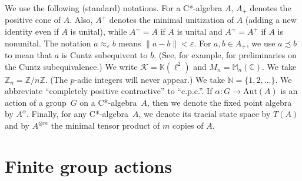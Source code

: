 \documentclass[11pt]{amsart}
\theoremstyle{plain}
\theoremstyle{definition}
\newtheorem{remark}[theorem]{Remark}
\theoremstyle{remark}
\numberwithin{equation}{section}
\newcommand{\af}{\alpha}
\begin{document}
\medskip

We use the following (standard) notations.
For a C*-algebra $A$, $A_{+}$ denotes the positive cone of $A$.
Also, $A^{+}$ denotes the minimal unitization of $A$
(adding a new identity even if $A$ is unital),
while $A^{\sim} = A$ if $A$ is unital and
$A^{\sim} = A^{+}$ if $A$ is nonunital.
The notation $a \approx_{\varepsilon} b$
means $\|a - b\| < \varepsilon$.
For $a,b\in A_+$, we use $a\precsim b$ to mean
that $a$ is Cuntz subequivent to $b$.
(See, for example, \cite{Ph14, AGJP21} for 
 preliminaries on the Cuntz subequivalence.)
We write $\mathcal{K} =\mathbb K (\ell^{2})$ and
${M}_{n} =\mathbb  M_{n} (\mathbb{C})$.
We take ${\mathbb{Z}}_n = {\mathbb{Z}} / n {\mathbb{Z}}$.
(The $p$-adic integers will never appear.)
We take $\mathbb{N} = \{ 1, 2, \ldots \}$.
We abbreviate ``completely positive contractive'' to ``c.p.c.''.
If $\af \colon G \to {\mathrm{Aut}} (A)$ is an action of a group~$G$
on a C*-algebra~$A$,
then we denote  the fixed point algebra by $A^{\af}$.
Finally, for any C*-algebra~$A$,
we denote its tracial state space by $T (A)$
and by $A^{\otimes m}$ the minimal tensor product of
$m$ copies of $A$.





\indent


\section{Finite group actions}\label{sec_crossf}
\end{document}
